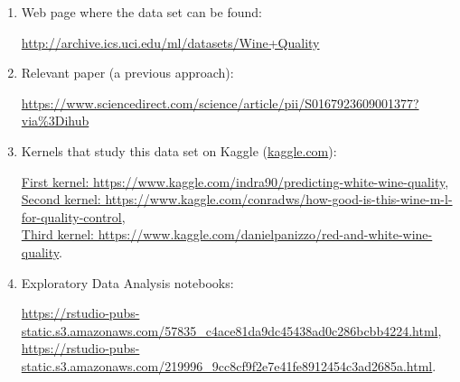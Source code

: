 \documentclass[10pt]{article}
\begin{document}
\begin{enumerate}
  \item Web page where the data set can be found:

  \href{http://archive.ics.uci.edu/ml/datasets/Wine+Quality}{ http://archive.ics.uci.edu/ml/datasets/Wine+Quality}

  \item Relevant paper (a previous approach):

  \href{https://www.sciencedirect.com/science/article/pii/S0167923609001377?via\%3Dihub}{ https://www.sciencedirect.com/science/article/pii/S0167923609001377?via\%3Dihub}

  \item Kernels that study this data set on Kaggle (\href{www.kaggle.com}{kaggle.com}):

  \href{https://www.kaggle.com/indra90/predicting-white-wine-quality}{First kernel: https://www.kaggle.com/indra90/predicting-white-wine-quality},\\
  \href{https://www.kaggle.com/conradws/how-good-is-this-wine-m-l-for-quality-control}{Second kernel: https://www.kaggle.com/conradws/how-good-is-this-wine-m-l-for-quality-control},\\
  \href{https://www.kaggle.com/danielpanizzo/red-and-white-wine-quality}{Third kernel: https://www.kaggle.com/danielpanizzo/red-and-white-wine-quality}.

  \item Exploratory Data Analysis notebooks:

  \url{https://rstudio-pubs-static.s3.amazonaws.com/57835_c4ace81da9dc45438ad0c286bcbb4224.html},\\
  \url{https://rstudio-pubs-static.s3.amazonaws.com/219996_9cc8cf9f2e7e41fe8912454c3ad2685a.html}.
  


\end{enumerate}
\end{document}

